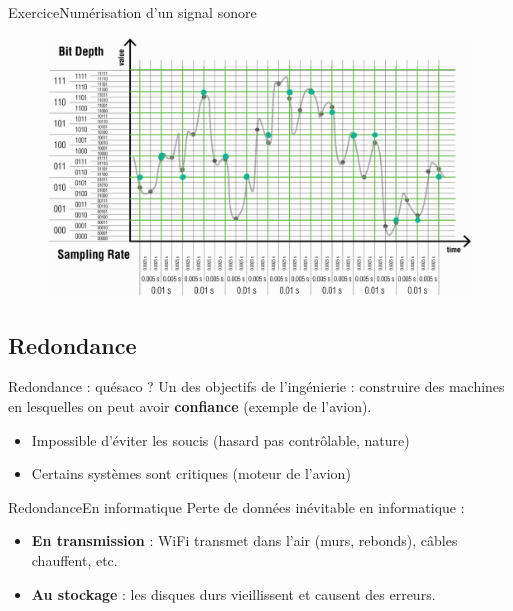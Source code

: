 \documentclass{beamer}
\begin{document}
\begin{frame}{Exercice}{Numérisation d'un signal sonore}
	\begin{figure}
		\includegraphics[width=1\linewidth]{solution-sampling-2.png}
	\end{figure}
\end{frame}


\subsection{Redondance}

\begin{frame}{Redondance : quésaco ?}{}
	Un des objectifs de l'ingénierie : construire des machines en lesquelles on peut avoir \textbf{confiance} (exemple de l'avion).
	\begin{itemize}
		\item <2-> Impossible d'éviter les soucis (hasard pas contrôlable, nature)
		\item <3-> Certains systèmes sont critiques (moteur de l'avion)
	\end{itemize}
\end{frame}

\begin{frame}{Redondance}{En informatique}
	Perte de données inévitable en informatique :
	\begin{itemize}
		\item <2-> \textbf{En transmission} : WiFi transmet dans l'air (murs, rebonds), câbles chauffent, etc.
		\item <3-> \textbf{Au stockage} : les disques durs vieillissent et causent des erreurs.
	\end{itemize}
\end{frame}
\end{document}
